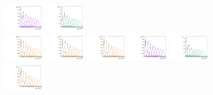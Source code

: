 \begin{figure}[htbp]
  \includegraphics[width=0.18\textwidth]{fig/analysis/templateSignalVsMX_fromDC_WprToWZ_MVV_mu_LP_bb_DEtaLo.pdf}
  \includegraphics[width=0.18\textwidth]{fig/analysis/templateSignalVsMX_fromDC_WprToWH_MVV_mu_LP_bb_DEtaLo.pdf}\\
  \includegraphics[width=0.18\textwidth]{fig/analysis/templateSignalVsMX_fromDC_GbuToWW_MVV_mu_HP_nobb_DEtaLo.pdf}
  \includegraphics[width=0.18\textwidth]{fig/analysis/templateSignalVsMX_fromDC_RadToWW_MVV_mu_HP_nobb_DEtaLo.pdf}
  \includegraphics[width=0.18\textwidth]{fig/analysis/templateSignalVsMX_fromDC_ZprToWW_MVV_mu_HP_nobb_DEtaLo.pdf}
  \includegraphics[width=0.18\textwidth]{fig/analysis/templateSignalVsMX_fromDC_WprToWZ_MVV_mu_HP_nobb_DEtaLo.pdf}
  \includegraphics[width=0.18\textwidth]{fig/analysis/templateSignalVsMX_fromDC_WprToWH_MVV_mu_HP_nobb_DEtaLo.pdf}\\
  \includegraphics[width=0.18\textwidth]{fig/analysis/templateSignalVsMX_fromDC_GbuToWW_MVV_mu_LP_nobb_DEtaLo.pdf}

\end{figure}
